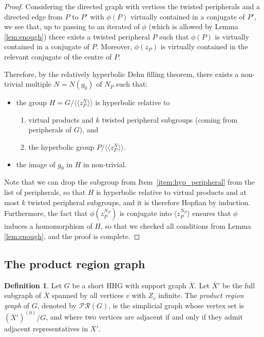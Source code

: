 \documentclass[svgnames]{amsart}
\theoremstyle{plain}
\theoremstyle{definition}
\newtheorem{defn}[thm]{Definition}
\newcommand{\ov}[1]{\overline{#1}}
\begin{document}
\begin{proof}
 Considering the directed graph with vertices the twisted peripherals and a directed edge from $P$ to $P'$ with $\phi(P)$ virtually contained in a conjugate of $P'$, we see that, up to passing to an iterated of $\phi$ (which is allowed by Lemma \ref{lem:enough}) there exists a twisted peripheral $P$ such that $\phi(P)$ is virtually contained in a conjugate of $P$. Moreover, $\phi(z_P)$ is virtually contained in the relevant conjugate of the centre of $P$.

 \par\medskip
 Therefore, by the relatively hyperbolic Dehn filling theorem, there exists a non-trivial multiple $N=N(g_0)$ of $N_P$ such that:
 \begin{itemize}
     \item the group $H=G/\langle\langle z_P^{N}\rangle\rangle$ is hyperbolic relative to
    \begin{enumerate}
        \item virtual products and $k$ twisted peripheral subgroups (coming from peripherals of $G$), and
        \item\label{item:hyp_peripheral} the hyperbolic group $P/\langle\langle z_P^{N}\rangle\rangle$.
    \end{enumerate}
    \item the image of $g_0$ in $H$ in non-trivial.
 \end{itemize}

Note that we can drop the subgroup from Item~\ref{item:hyp_peripheral} from the list of peripherals, so that $H$ is hyperbolic relative to virtual products and at most $k$ twisted peripheral subgroups, and it is therefore Hopfian by induction. Furthermore, the fact that $\phi(z_P^{N_P})$ is conjugate into $\langle z_P^{N_P}\rangle$ ensures that $\phi$ induces a homomorphism of $H$, so that we checked all conditions from Lemma \ref{lem:enough}, and the proof is complete.
\end{proof}



\subsection{The product region graph}\label{subsec:pr_graph}
\begin{defn}
    Let $G$ be a short HHG with support graph $\ov{X}$. Let $\ov{X}'$ be the full subgraph of $\ov{X}$ spanned by all vertices $v$ with $Z_v$ infinite. The \emph{product region graph} of $G$, denoted by $\mathcal{PR}(G)$, is the simplicial graph whose vertex set is $(\ov X')^{(0)}/G$, and where two vertices are adjacent if and only if they admit adjacent representatives in $\ov X'$.
\end{defn}
\end{document}

